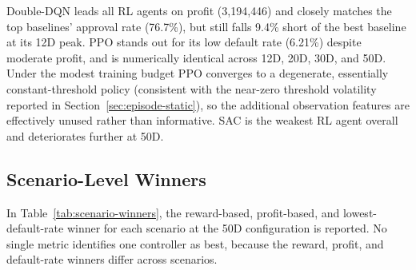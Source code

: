 \documentclass[preprint,review,authoryear,12pt]{elsarticle}
\begin{document}
Double-DQN leads all RL agents on profit (3{,}194{,}446) and closely matches the top
baselines' approval rate (76.7\%), but still falls 9.4\% short of the best baseline at
its 12D peak. PPO stands out for its low default rate (6.21\%) despite moderate profit,
and is numerically identical across 12D, 20D, 30D, and 50D. Under the modest training
budget PPO converges to a degenerate, essentially constant-threshold policy (consistent
with the near-zero threshold volatility reported in Section~\ref{sec:episode-static}), so
the additional observation features are effectively unused rather than informative. SAC
is the weakest RL agent overall and deteriorates further at 50D.

\subsection{Scenario-Level Winners}

In Table~\ref{tab:scenario-winners}, the reward-based, profit-based, and
lowest-default-rate winner for each scenario at the 50D configuration is reported. No
single metric identifies one controller as best, because the reward, profit, and
default-rate winners differ across scenarios.
\end{document}
